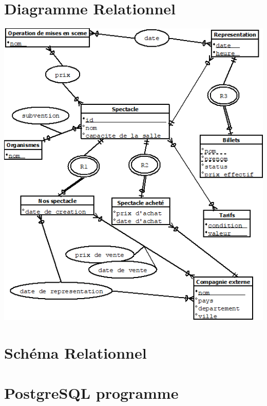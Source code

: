 \documentclass[10pt]{report}
\begin{document}
\chapter{Diagramme Relationnel}
\includegraphics[width=15cm]{relationnel_diagramme.png}
\chapter{Schéma Relationnel}
\chapter{PostgreSQL programme}
\end{document}
